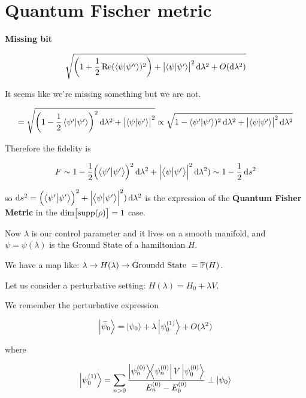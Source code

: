 \section{Quantum Fischer metric}

\textbf{Missing bit}

\begin{equation}
  \sqrt{\qty(1+ \frac{1}{2} \Re(\braket{\psi}{\psi''} )^2) + \abs{\braket{\psi}{\psi'} }^2 \dd{\lambda^2} + O(\dd{\lambda^2}) }
\end{equation}

It seems like we're missing something but we are not.

\begin{equation}
  = \sqrt{\qty(1 - \frac{1}{2} \braket{\psi'}{\psi'} )^2 \dd{\lambda^2} + \abs{\braket{\psi}{\psi'} }^2 }
  \propto \sqrt{1 - \braket{\psi'}{\psi'} )^2 \dd{\lambda^2}  + \abs{\braket{\psi}{\psi'} }^2 \dd{\lambda^2}}
\end{equation}

Therefore the fidelity is

\begin{equation}
  F \sim 1 - \frac{1}{2} \qty(\braket{\psi'}{\psi'} )^2 \dd{\lambda^2}  + \abs{\braket{\psi}{\psi'} }^2 \dd{\lambda^2})
  \sim 1 - \frac{1}{2}\dd{s^2}
\end{equation}

so \(\dd{s^2} = \qty(\braket{\psi'}{\psi'} )^2  + \abs{\braket{\psi}{\psi'} }^2) \dd{\lambda^2}\)
is the expression of the \textbf{Quantum Fisher Metric} in the \(\dim \qty[ \supp{\rho}] = 1\) case.

Now \(\lambda\) is our control parameter and it lives on a smooth manifold, and \(\psi = \psi(\lambda)\) is the Ground State of a hamiltonian \(H\).

We have a map like: \(\lambda \rightarrow H(\lambda) \rightarrow \text{Groundd State }  = \P H\).

Let us consider a perturbative setting: \(H(\lambda) = H_0 + \lambda V\).

We remember the perturbative expression

\begin{equation}
  \ket{\widetilde{\psi}_0 } = \ket{\psi_0} + \lambda \ket{\psi_0^{(1)}} + O(\lambda^2)
\end{equation}

where

\begin{equation}
  \ket{\psi_0 ^{(1)} } = \sum _{n>0} \frac{\dyad{\psi_n ^{(0)}} V \ket{\psi_0 ^{(0)} }}{E_n ^{(0)}  -  E_0 ^{(0)} } \perp \ket{\psi_0}
\end{equation}

